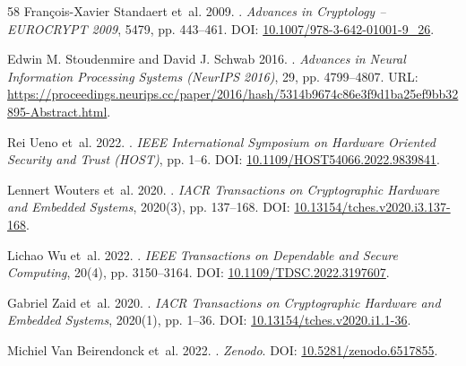 \documentclass[letterpaper]{article}
\begin{document}
\begin{thebibliography}{58}
Fran{\c{c}}ois-Xavier Standaert et~al. 2009.
.
\newblock \emph{Advances in Cryptology -- EUROCRYPT 2009}, 5479, pp. 443--461.
\newblock DOI: \href{https://doi.org/10.1007/978-3-642-01001-9_26}{10.1007/978-3-642-01001-9_26}.

Edwin M. Stoudenmire and David J. Schwab 2016.
.
\newblock \emph{Advances in Neural Information Processing Systems (NeurIPS 2016)}, 29, pp. 4799--4807.
\newblock URL: \url{https://proceedings.neurips.cc/paper/2016/hash/5314b9674c86e3f9d1ba25ef9bb32895-Abstract.html}.

Rei Ueno et~al. 2022.
.
\newblock \emph{IEEE International Symposium on Hardware Oriented Security and Trust (HOST)}, pp. 1--6.
\newblock DOI: \href{https://doi.org/10.1109/HOST54066.2022.9839841}{10.1109/HOST54066.2022.9839841}.

Lennert Wouters et~al. 2020.
.
\newblock \emph{IACR Transactions on Cryptographic Hardware and Embedded Systems}, 2020(3), pp. 137--168.
\newblock DOI: \href{https://doi.org/10.13154/tches.v2020.i3.137-168}{10.13154/tches.v2020.i3.137-168}.

Lichao Wu et~al. 2022.
.
\newblock \emph{IEEE Transactions on Dependable and Secure Computing}, 20(4), pp. 3150--3164.
\newblock DOI: \href{https://doi.org/10.1109/TDSC.2022.3197607}{10.1109/TDSC.2022.3197607}.

Gabriel Zaid et~al. 2020.
.
\newblock \emph{IACR Transactions on Cryptographic Hardware and Embedded Systems}, 2020(1), pp. 1--36.
\newblock DOI: \href{https://doi.org/10.13154/tches.v2020.i1.1-36}{10.13154/tches.v2020.i1.1-36}.

Michiel Van Beirendonck et~al. 2022.
.
\newblock \emph{Zenodo}.
\newblock DOI: \href{https://doi.org/10.5281/zenodo.6517855}{10.5281/zenodo.6517855}.

\end{thebibliography}
\end{document}
